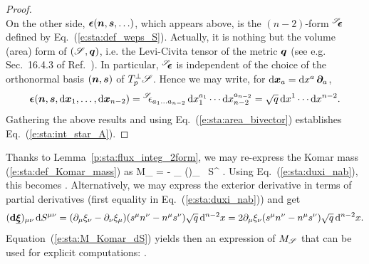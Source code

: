 \begin{proof}
\[\]
On the other side,
$\bm{\epsilon}(\bm{n}, \bm{s}, \ldots)$, which appears above, is the $(n-2)$-form
${}^{\mathscr{S}}\!\!\bm{\epsilon}$ defined by Eq.~(\ref{e:sta:def_weps_S}). Actually, it is
nothing but the volume (area) form of $(\mathscr{S},\bm{q})$, i.e. the Levi-Civita tensor of the metric $\bm{q}$
(see e.g. Sec.~16.4.3 of Ref.~\cite{Gourg13}).
In particular, ${}^{\mathscr{S}}\!\!\bm{\epsilon}$ is independent of the choice of the orthonormal
basis $(\bm{n},\bm{s})$ of $T_p^\perp\mathscr{S}$.
Hence we may write, for
$\mathrm{d}\bm{x}_{a} = \mathrm{d} x^a \, \bm{\partial}_a$,
\[
    \bm{\epsilon}(\bm{n}, \bm{s}, \mathrm{d}\bm{x}_{1}, \ldots , \mathrm{d}\bm{x}_{n-2}) =
        {}^{\mathscr{S}}\!\!\epsilon_{a_1\ldots a_{n-2}} \, \mathrm{d} x_{1}^{a_1}\cdots  \mathrm{d} x_{n-2}^{a_{n-2}}
        = \sqrt{q} \, \mathrm{d} x^1 \cdots  \mathrm{d} x^{n-2} .
\]
Gathering the above results and using Eq.~(\ref{e:sta:area_bivector})
establishes Eq.~(\ref{e:sta:int_star_A}).
\end{proof}

Thanks to Lemma~\ref{p:sta:flux_integ_2form}, we may re-express the Komar mass
(\ref{e:sta:def_Komar_mass}) as
\be \label{e:sta:M_Komar_dS}
   M_{\Sp} = -   \int_{\Sp} (\dd \uu{\xi})_{\mu\nu} \,  \D S^{\mu\nu} .
\ee
Using Eq.~(\ref{e:sta:duxi_nab}), this becomes
\be \label{e:sta:Komar_mass_flux_nabla_xi}
     .
\ee
Alternatively, we may express the exterior derivative in terms of
partial derivatives (first equality in Eq.~(\ref{e:sta:duxi_nab})) and get
\[
    (\mathbf{d} \underline{\bm{\xi}})_{\mu\nu} \,  \mathrm{d} S^{\mu\nu} =
    (\partial_\mu \xi_\nu - \partial_\nu \xi_\mu)
    (s^\mu n^\nu - n^\mu s^\nu) \sqrt{q}\, \mathrm{d}^{n-2} x
    = 2 \partial_\mu \xi_\nu  (s^\mu  n^\nu - n^\mu  s^\nu)
    \sqrt{q}\, \mathrm{d}^{n-2} x  .
\]
Equation~(\ref{e:sta:M_Komar_dS}) yields then an expression of $M_{\mathscr{S}}$ that
can be used for explicit computations:
\be \label{e:sta:M_Komar_partial_der}
     .
\ee

